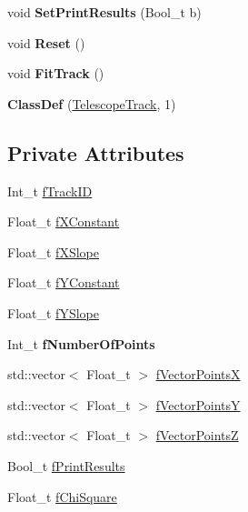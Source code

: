 \begin{DoxyCompactItemize}
\item 
\mbox{\label{class_telescope_track_a449557b14b4f59237a14e425b8f35f03}} 
void {\bfseries Set\+Print\+Results} (Bool\+\_\+t b)
\item 
\mbox{\label{class_telescope_track_ab4ea8add9de20aa04af48783d1514c91}} 
void {\bfseries Reset} ()
\item 
\mbox{\label{class_telescope_track_a1eb2b141f7ed1063fa901ed00cf8b90e}} 
void {\bfseries Fit\+Track} ()
\item 
\mbox{\label{class_telescope_track_aa041988968d0ed95afd593011bccfa9f}} 
{\bfseries Class\+Def} (\mbox{\hyperlink{class_telescope_track}{Telescope\+Track}}, 1)
\end{DoxyCompactItemize}
\subsection*{Private Attributes}
\begin{DoxyCompactItemize}
\item 
Int\+\_\+t \mbox{\hyperlink{class_telescope_track_a64977c9f478eba9beb2ae6026e0b7e0a}{f\+Track\+ID}}
\item 
Float\+\_\+t \mbox{\hyperlink{class_telescope_track_a3bab476931d460ea80cd9700c29ee2f9}{f\+X\+Constant}}
\item 
Float\+\_\+t \mbox{\hyperlink{class_telescope_track_a14fdd27ed94d2b69730e56fd2fbbc0ef}{f\+X\+Slope}}
\item 
Float\+\_\+t \mbox{\hyperlink{class_telescope_track_a8e5aa9428a73c38ce626d89bad494ec1}{f\+Y\+Constant}}
\item 
Float\+\_\+t \mbox{\hyperlink{class_telescope_track_aa522f83a156341cd06a868c9f4692953}{f\+Y\+Slope}}
\item 
\mbox{\label{class_telescope_track_a5765f94c6ca2e1ca5c7074c20c410698}} 
Int\+\_\+t {\bfseries f\+Number\+Of\+Points}
\item 
std\+::vector$<$ Float\+\_\+t $>$ \mbox{\hyperlink{class_telescope_track_a587fff80c330ef66a47017c0e0fe64e0}{f\+Vector\+PointsX}}
\item 
std\+::vector$<$ Float\+\_\+t $>$ \mbox{\hyperlink{class_telescope_track_ad299ce3251a1c5628bc3949effffe125}{f\+Vector\+PointsY}}
\item 
std\+::vector$<$ Float\+\_\+t $>$ \mbox{\hyperlink{class_telescope_track_ac1df4135d9b6d03c66397a017003c675}{f\+Vector\+PointsZ}}
\item 
Bool\+\_\+t \mbox{\hyperlink{class_telescope_track_ad7ef1d1faa561a6921cd1442d8856e64}{f\+Print\+Results}}
\item 
Float\+\_\+t \mbox{\hyperlink{class_telescope_track_a0254ea60690e1f619a64191b1ae1e726}{f\+Chi\+Square}}
\end{DoxyCompactItemize}


